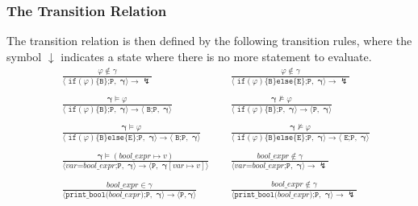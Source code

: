 \documentclass{article}
\begin{document}
\subsubsection{The Transition Relation}
The transition relation is then defined by the following transition rules, 
where the symbol $\downarrow$ indicates a state where there is no more statement to evaluate.
\begin{align*}
    &\; \frac{\varphi \notin \gamma}{\langle \texttt{ if}(\varphi)\texttt{\{B\};P}, \, \,  \mathbf{\gamma} \rangle \rightarrow \lightning} &&\;
      \frac{\varphi \notin \gamma}{\langle \texttt{ if}(\varphi)\texttt{\{B\}else\{E\};P}, \, \, \mathbf{\gamma} \rangle \rightarrow \lightning} \\ \\
    &\; \frac{\mathbf{\gamma} \vDash \varphi}{\langle \texttt{ if}(\varphi)\texttt{\{B\};P}, \, \,  \mathbf{\gamma} \rangle \rightarrow \langle \texttt{ B;P}, \, \,  \mathbf{\gamma} \rangle} &&\;
      \frac{\mathbf{\gamma} \nvDash \varphi}{\langle \texttt{ if}(\varphi)\texttt{\{B\};P}, \, \, \mathbf{\gamma} \rangle \rightarrow \langle \texttt{P}, \, \, \mathbf{\gamma} \rangle} \\ \\
    &\; \frac{\mathbf{\gamma} \vDash \varphi}{\langle \texttt{ if}(\varphi)\texttt{\{B\}else\{E\};P}, \, \, \mathbf{\gamma} \rangle \rightarrow \langle \texttt{ B;P}, \, \, \mathbf{\gamma} \rangle} &&\;
      \frac{\mathbf{\gamma} \nvDash \varphi}{\langle \texttt{ if}(\varphi)\texttt{\{B\}else\{E\};P}, \, \, \mathbf{\gamma} \rangle \rightarrow \langle \texttt{ E;P}, \, \, \mathbf{\gamma} \rangle} \\ \\
    &\;\frac{\mathbf{\gamma} \vDash (bool\_expr \mapsto v)}{\langle var\texttt{=}bool\_expr\texttt{;P}, \, \, \mathbf{\gamma} \rangle \rightarrow \langle \texttt{P}, \, \, \mathbf{\gamma}[var \mapsto v] \rangle } &&\;
      \frac{bool\_expr \notin \gamma}{\langle var\texttt{=}bool\_expr\texttt{;P}, \, \, \mathbf{\gamma} \rangle \rightarrow \lightning } \\  \\
    &\;\frac{bool\_expr \in \gamma}{\langle \texttt{print\_bool(}bool\_expr\texttt{);P}, \, \,  \mathbf{\gamma}\rangle \rightarrow \langle \texttt{P}, \mathbf{\gamma} \rangle} &&\;
       \frac{bool\_expr \notin \gamma}{\langle \texttt{print\_bool(}bool\_expr\texttt{);P},  \, \, \mathbf{\gamma}\rangle \rightarrow \lightning} \\  \\

\end{align*}
\end{document}
